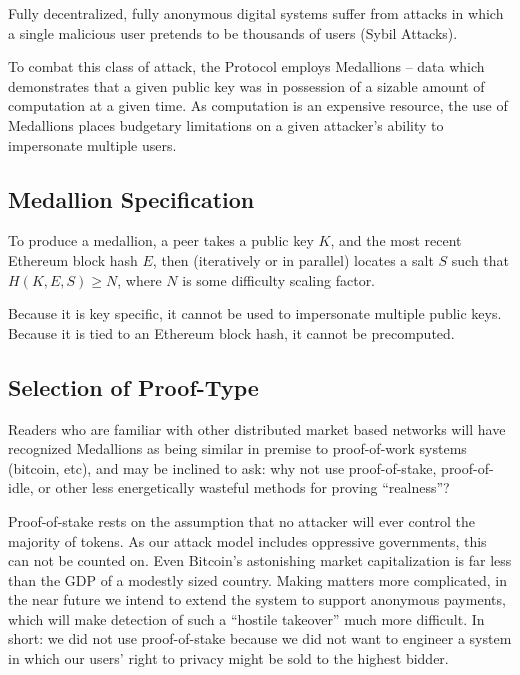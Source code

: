 
Fully decentralized, fully anonymous digital systems suffer from
attacks in which a single malicious user pretends to be thousands of
users (Sybil Attacks).

To combat this class of attack, the \Orchid{} Protocol employs
Medallions -- data which demonstrates that a given public key was in
possession of a sizable amount of computation at a given time. As
computation is an expensive resource, the use of Medallions places
budgetary limitations on a given attacker's ability to impersonate
multiple users.

\subsection{Medallion Specification}

To produce a medallion, a peer takes a public key $K$, and the most
recent Ethereum block hash $E$, then (iteratively or in parallel)
locates a salt $S$ such that $H(K, E, S) \geq N$, where $N$ is some
difficulty scaling factor.

Because it is key specific, it cannot be used to impersonate multiple
public keys. Because it is tied to an Ethereum block hash, it cannot
be precomputed.

\subsection{Selection of Proof-Type}

Readers who are familiar with other distributed market based networks will have recognized Medallions as being similar in premise to proof-of-work systems (bitcoin, etc), and may be inclined to ask: why not use proof-of-stake, proof-of-idle, or other less energetically wasteful methods for proving “realness”?

Proof-of-stake rests on the assumption that no attacker will ever control the majority of tokens. As our attack model includes oppressive governments, this can not be counted on. Even Bitcoin’s astonishing market capitalization is far less than the GDP of a modestly sized country. Making matters more complicated, in the near future we intend to extend the system to support anonymous payments, which will make detection of such a ``hostile takeover'' much more difficult. In short: we did not use proof-of-stake because we did not want to engineer a system in which our users’ right to privacy might be sold to the highest bidder.

